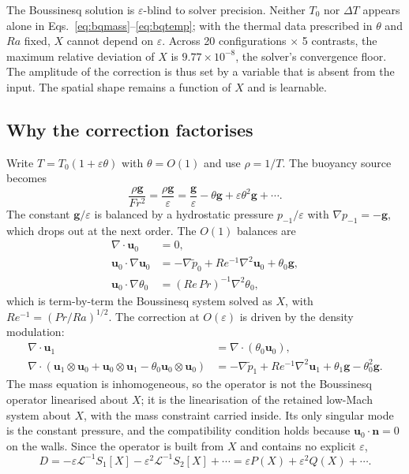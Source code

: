 \documentclass[preprint,11pt,a4paper,times,doubleblind]{elsarticle}
\begin{document}
The Boussinesq solution is $\varepsilon$-blind to solver precision. Neither $T_0$ nor $\Delta T$ appears
alone in Eqs.~\eqref{eq:bqmass}--\eqref{eq:bqtemp}; with the thermal data prescribed in
$\theta$ and $Ra$ fixed, $X$ cannot depend on $\varepsilon$. Across 20 configurations
$\times$ 5 contrasts, the maximum relative deviation of $X$ is $9.77\times10^{-8}$, the
solver's convergence floor. The amplitude of the correction is thus set by a variable that is
absent from the input. The spatial shape remains a function of $X$ and is learnable.

\subsection{Why the correction factorises}

Write $T=T_0(1+\varepsilon\theta)$ with $\theta=O(1)$ and use $\rho=1/T$. The buoyancy source
becomes
\begin{equation}
  \frac{\rho\bm g}{Fr^2}=\frac{\rho\bm g}{\varepsilon}
  =\frac{\bm g}{\varepsilon}-\theta\bm g+\varepsilon\theta^2\bm g+\cdots.
  \label{eq:buoy}
\end{equation}
The constant $\bm g/\varepsilon$ is balanced by a hydrostatic pressure $p_{-1}/\varepsilon$
with $\nabla p_{-1}=-\bm g$, which drops out at the next order. The $O(1)$ balances are
\begin{align}
  \nabla\cdot\bm u_0&=0,\label{eq:o1mass}\\
  \bm u_0\cdot\nabla\bm u_0&=-\nabla\tilde p_0+Re^{-1}\nabla^2\bm u_0+\theta_0\bm g,\\
  \bm u_0\cdot\nabla\theta_0&=(Re\,Pr)^{-1}\nabla^2\theta_0,\label{eq:o1temp}
\end{align}
which is term-by-term the Boussinesq system solved as $X$, with
$Re^{-1}=(Pr/Ra)^{1/2}$. The correction at $O(\varepsilon)$ is driven by the density
modulation:
\begin{align}
  \nabla\cdot\bm u_1&=\nabla\cdot(\theta_0\bm u_0),\label{eq:div1}\\
  \nabla\cdot(\bm u_1\otimes\bm u_0+\bm u_0\otimes\bm u_1
  -\theta_0\bm u_0\otimes\bm u_0)
  &=-\nabla\tilde p_1+Re^{-1}\nabla^2\bm u_1+\theta_1\bm g-\theta_0^2\bm g.
  \label{eq:mom1}
\end{align}
The mass equation is inhomogeneous, so the operator is not the Boussinesq operator
linearised about $X$; it is the linearisation of the retained low-Mach system about $X$, with
the mass constraint carried inside. Its only singular mode is the constant pressure, and the
compatibility condition holds because $\bm u_0\cdot\bm n=0$ on the walls. Since the operator
is built from $X$ and contains no explicit $\varepsilon$,
\begin{equation}
  D=-\varepsilon\mathcal L^{-1}S_1[X]-\varepsilon^2\mathcal L^{-1}S_2[X]+\cdots
  =\varepsilon P(X)+\varepsilon^2 Q(X)+\cdots.
  \label{eq:expansion}
\end{equation}
\end{document}
